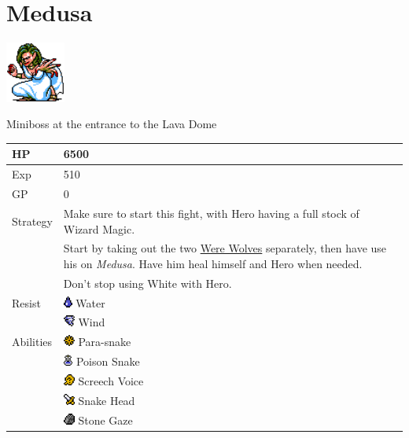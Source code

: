 \section{Medusa}
\label{monster:medusa}

\includegraphics[height=2cm,keepaspectratio]{./resources/monster/medusa}

Miniboss at the entrance to the Lava Dome

\begin{longtable}{ l p{9cm} }
	HP
	& 6500
\\ \hline
	Exp
	& 510
\\ \hline
	GP
	& 0
\\ \hline
	Strategy
	& Make sure to start this fight, with Hero having a full stock of Wizard Magic. \\
	& Start by taking out the two \hyperref[monster:were_wolf]{Were Wolves} separately, then have \nameref{char:reuben} use his \nameref{weapon:morning_star} on \textit{Medusa}. Have him heal himself and Hero when needed. \\
	& Don't stop using White with Hero.
\\ \hline
	Resist
	& \includegraphics[height=1em,keepaspectratio]{./resources/effects/water} Water \\
	& \includegraphics[height=1em,keepaspectratio]{./resources/effects/wind} Wind
\\ \hline
	Abilities
	& \includegraphics[height=1em,keepaspectratio]{./resources/effects/paralyze} Para-snake \\
	& \includegraphics[height=1em,keepaspectratio]{./resources/effects/poison} Poison Snake \\
	& \includegraphics[height=1em,keepaspectratio]{./resources/effects/confusion} Screech Voice \\
	& \includegraphics[height=1em,keepaspectratio]{./resources/effects/damage} Snake Head \\
	& \includegraphics[height=1em,keepaspectratio]{./resources/effects/petrify} Stone Gaze
\end{longtable}
